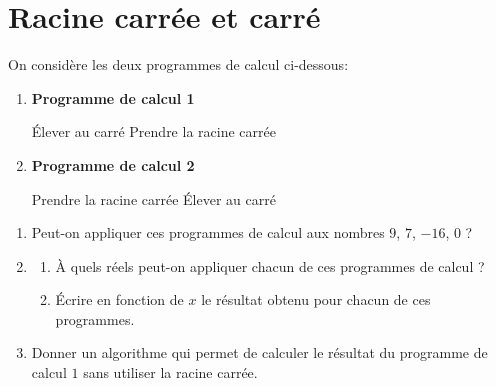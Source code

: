 \documentclass[a4paper,dvipsnames]{article}
\begin{document}
\section{Racine carrée et carré}

On considère les deux programmes de calcul ci-dessous:

\begin{multicols}{2}
  \begin{enumerate}
    \item[] \textbf{Programme de calcul 1}
      \begin{algorithmic}[1]
	\State Élever au carré
	\State Prendre la racine carrée
      \end{algorithmic}
    \item[] \textbf{Programme de calcul 2}
      \begin{algorithmic}[1]
	\State Prendre la racine carrée
	\State Élever au carré
      \end{algorithmic}
  \end{enumerate}
\end{multicols}

\begin{enumerate}
  \item Peut-on appliquer ces programmes de calcul aux nombres $9$, $7$, $-16$, $0$ ?
  \item 
    \begin{enumerate}
      \item À quels réels peut-on appliquer chacun de ces programmes de calcul ?
      \item Écrire en fonction de $x$ le résultat obtenu pour chacun de ces programmes.
    \end{enumerate}
  \item Donner un algorithme qui permet de calculer le résultat du programme de calcul $1$ sans utiliser la racine carrée.
\end{enumerate}
\end{document}
